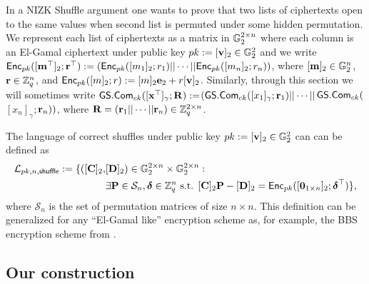 In a NIZK Shuffle argument one wants to prove that two lists of ciphertexts open to the same values when second list is permuted under some hidden permutation.
We represent each list of ciphertexts as a matrix in $\mathbb{G}_2^{2\times n}$ where each column is an El-Gamal ciphertext under public key $pk:=[\mathbf{v}]_2\in\mathbb{G}^2_2$ and we write $\mathsf{Enc}_{pk}([\mathbf{m}^\top]_2;\mathbf{r}^\top):=(\mathsf{Enc}_{pk}([m_1]_2;r_1)||\cdots||\mathsf{Enc}_{pk}([m_n]_2;r_n))$, where $[\mathbf{m}]_2\in\mathbb{G}_2^n$, $\mathbf{r}\in\mathbb{Z}_q^n$, and $\mathsf{Enc}_{pk}([m]_2;r):=[m]_2\mathbf{e}_2+r[\mathbf{v}]_2$. Similarly, through this section we will sometimes write ${\mathsf{GS}}.\mathsf{Com}_{ck}([\mathbf{x}^\top]_\gamma;\mathbf{{R}}):=$\-$({\mathsf{GS}}.\mathsf{Com}_{ck}([x_1]_\gamma;\mathbf{r}_1)||\cdots||$${\mathsf{GS}}.\mathsf{Com}_{ck}($$[x_n]_\gamma;$$\mathbf{r}_n))$, where $\mathbf{{R}}=(\mathbf{r}_1||\cdots||\mathbf{r}_n)\in\mathbb{Z}_q^{2\times n}$.

The language of correct shuffles under public key $pk:=[\mathbf{v}]_2\in\mathbb{G}^2_2$ can can be defined as 
\begin{align*}
\mathcal{L}_{pk,n,\mathsf{shuffle}}:=\{([\mathbf{{C}}]_2,&[\mathbf{{D}}]_2)\in\mathbb{G}_2^{2\times n}\times \mathbb{G}_2^{2\times n} :\\
                                                         &\exists \mathbf{{P}}\in\mathcal{S}_n,{\boldsymbol \delta}\in\mathbb{Z}_q^n \text{ s.t. } {[\mathbf{{C}}]_2\mathbf{{P}}-[\mathbf{{D}}]_2 = \mathsf{Enc}_{pk}([\mathbf{0}_{1\times n}]_2;{\boldsymbol \delta}^\top)}\},
\end{align*}
where $\mathcal{S}_n$ is the set of permutation matrices of size $n\times n$. This definition can be generalized for any ``El-Gamal like'' encryption scheme as, for example, the BBS encryption scheme from \cite{C:BonBoySha04}.

 
\subsection{Our construction}

